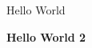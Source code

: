 \documentclass[a4paper]{article}
\begin{document}
  Hello World



  \textbf{Hello World 2}
\end{document}
